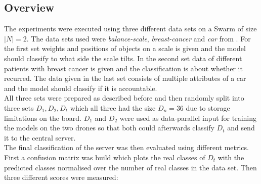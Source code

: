 \subsection*{Overview}
The experiments were executed using three different data sets on a Swarm of size $|N| = 2$. The data sets used were \textit{balance-scale}, \textit{breast-cancer} and \textit{car} from \cite{Dua:2019}. For the first set weights and positions of objects on a scale is given and the model should classify to what side the scale tilts. In the second set data of different patients with breast cancer is given and the classification is about whether it recurred. The data given in the last set consists of multiple attributes of a car and the model should classify if it is accountable. \\
All three sets were prepared as described before and then randomly split into three sets $D_1,D_2,D_t$ which all three had the size $D_n = 36$ due to storage limitations on the board. $D_1$ and $D_2$ were used as data-parallel input for training the models on the two drones so that both could afterwards classify $D_t$ and send it to the central server. \\
The final classification of the server was then evaluated using different metrics. First a confusion matrix was build which plots the real classes of $D_t$ with the predicted classes normalised over the number of real classes in the data set. Then three different scores were measured:


